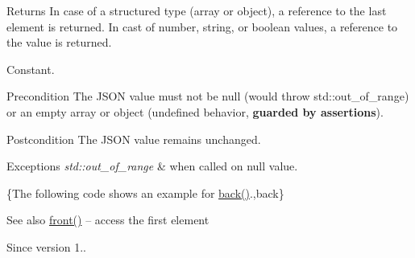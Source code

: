 \begin{DoxyReturn}{Returns}
In case of a structured type (array or object), a reference to the last element is returned. In cast of number, string, or boolean values, a reference to the value is returned.
\end{DoxyReturn}
Constant.

\begin{DoxyPrecond}{Precondition}
The J\+S\+ON value must not be {\ttfamily null} (would throw {\ttfamily std\+::out\+\_\+of\+\_\+range}) or an empty array or object (undefined behavior, {\bfseries guarded by assertions}). 
\end{DoxyPrecond}
\begin{DoxyPostcond}{Postcondition}
The J\+S\+ON value remains unchanged.
\end{DoxyPostcond}

\begin{DoxyExceptions}{Exceptions}
{\em std\+::out\+\_\+of\+\_\+range} & when called on {\ttfamily null} value.\\
\hline
\end{DoxyExceptions}
\{The following code shows an example for {\ttfamily \hyperlink{classnlohmann_1_1basic__json_a71b1d38ef402dfee58fba1fe01fa67f5}{back()}}.,back\}

\begin{DoxySeeAlso}{See also}
\hyperlink{classnlohmann_1_1basic__json_aa45753034bea87f9d2c0c42ace9ff75c}{front()} -- access the first element
\end{DoxySeeAlso}
\begin{DoxySince}{Since}
version 1.. 
\end{DoxySince}
\hypertarget{classnlohmann_1_1basic__json_a5b3bd4f3fc1458835770c5a22cb74de1}{}\label{classnlohmann_1_1basic__json_a5b3bd4f3fc1458835770c5a22cb74de1} 
